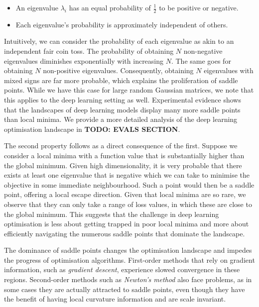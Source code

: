 \begin{itemize}

    \item An eigenvalue $\lambda_i$ has an equal probability of $\frac{1}{2}$ to be positive or negative. 

    \item Each eigenvalue's probability is approximately independent of others.

\end{itemize}




Intuitively, we can consider the probability of each eigenvalue as akin to an independent fair coin toss. The probability of obtaining $N$ non-negative eigenvalues diminishes exponentially with increasing $N$. The same goes for obtaining $N$ non-positive eigenvalues. Consequently, obtaining $N$ eigenvalues with mixed signs are far more probable, which explains the proliferation of saddle points. While we have this case for large random Gaussian matrices, we note that this applies to the deep learning setting as well. Experimental evidence shows that the landscapes of deep learning models display many more saddle points than local minima. We provide a more detailed analysis of the deep learning optimisation landscape in \textbf{TODO: EVALS SECTION}.




The second property follows as a direct consequence of the first. Suppose we consider a local minima with a function value that is substantially higher than the global minimum. Given high dimensionality, it is very probable that there exists at least one eigenvalue that is negative which we can take to minimise the objective in some immediate neighbourhood. Such a point would then be a saddle point, offering a local escape direction. Given that local minima are so rare, we observe that they can only take a range of loss values, in which these are close to the global minimum. This suggests that the challenge in deep learning optimisation is less about getting trapped in poor local minima and more about efficiently navigating the numerous saddle points that dominate the landscape. 



The dominance of saddle points changes the optimisation landscape and impedes the progress of optimisation algorithms. First-order methods that rely on gradient information, such as \textit{gradient descent}, experience slowed convergence in these regions. Second-order methods such as \textit{Newton's method} also face problems, as in some cases they are actually attracted to saddle points, even though they have the benefit of having local curvature information and are scale invariant. 



